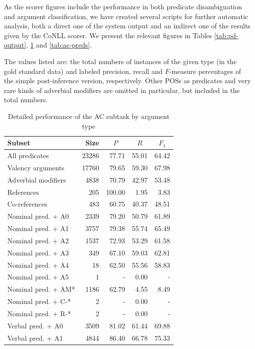 \documentclass[12pt,notitlepage,a4paper]{report}
\begin{document}
As the scorer figures include the performance in both predicate disambiguation and argument classification, we have created several scripts for further automatic analysis, both a direct one of the system output and an indirect one of the results given by the CoNLL scorer. We present the relevant figures in Tables \ref{tab:pd-output}, \ref{tab:ac-output} and \ref{tab:ac-preds}.

\begin{table}[p]\footnotesize
\caption{Detailed performance of the AC subtask by argument type}\label{tab:ac-output}
The values listed are: the total numbers of instances of the given type (in the gold standard data) and labeled precision, recall and $F$-measure percentages of the simple post-inference version, respectively. Other POSs as predicates and very rare kinds of adverbial modifiers are omitted in particular, but included in the total numbers.
\begin{center}
\begin{tabular}{|l|r|r|r|r|}\hline
\bf Subset & \bf Size & \multicolumn{1}{c|}{$P$} & \multicolumn{1}{c|}{$R$} & \multicolumn{1}{c|}{$F_1$} \\\hline\hline
All predicates & 23286 & 77.71 & 55.01 & 64.42 \\\hline
Valency arguments & 17760 & 79.65 & 59.30 & 67.98 \\
Adverbial modifiers & 4838 & 70.79 & 42.97 & 53.48 \\
References & 205 & 100.00 & 1.95 & 3.83 \\
Co-references & 483 & 60.75 & 40.37 & 48.51 \\\hline\hline
Nominal pred. + A0 & 2339 & 79.20 & 50.79 & 61.89 \\
Nominal pred. + A1 & 3757 & 79.38 & 55.74 & 65.49 \\
Nominal pred. + A2 & 1537 & 72.93 & 53.29 & 61.58 \\
Nominal pred. + A3 & 349 & 67.10 & 59.03 & 62.81 \\
Nominal pred. + A4 & 18 & 62.50 & 55.56 & 58.83 \\
Nominal pred. + A5 & 1 & - & 0.00 & - \\
Nominal pred. + AM* & 1186 & 62.79 & 4.55 & 8.49 \\
Nominal pred. + C-* & 2 & - & 0.00 & - \\
Nominal pred. + R-* & 2 & - & 0.00 & - \\
Verbal pred. + A0 & 3509 & 81.02 & 61.44 & 69.88 \\
Verbal pred. + A1 & 4844 & 86.40 & 66.78 & 75.33 \\

\end{tabular}
\end{center}
\end{table}
\end{document}
